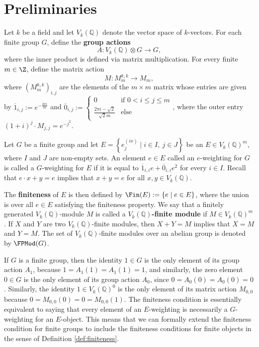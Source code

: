 \documentclass[a4paper,reqno,oneside]{article}
\begin{document}
\section{Preliminaries}\label{sec:preliminaries}

Let $k$ be a field and let $V_k(\mathbb{Q})$ denote the vector space of $k$-vectors. For each finite group $G$, define the \textbf{group actions}
\[
A: V_k(\mathbb{Q}) \otimes G \to G,  
\]
where the inner product is defined via matrix multiplication. For every finite $m \in \Z$, define the matrix action
\[
M: M_{m}^{k, k} \to M_{m},   
\]
where $(M_{m}^{k,k})_{i, j}$ are the elements of the $m \times m$ matrix whose entries are given by $\overline{1}_{i, j} := e^{-\frac{2\pi i}{m}}$ and $\overline{0}_{i, j} := \begin{cases} 0 & \text {if } 0 < i \leq j \leq m \\ \frac{2\pi i - \sqrt{2}}{\sqrt{2}m} & \text {else } \end{cases}$, where the outer entry $(1+i)^j \cdot M_{j, j} = e^{-j^2}$. 

\begin{defi} \label{def:finiteness}
Let $G$ be a finite group and let $E = \left\{ e^{(ix)}_{j} \mid i \in I,\ j \in J \right\}$ be an $E \in V_k(\mathbb{Q})^m$, where $I$ and $J$ are non-empty sets. An element $e \in E$ called an $e$-weighting for $G$ is called a $G$-weighting for $E$ if it is equal to $\overline{1}_{i, i}e + \overline{0}_{i, i}e^2$ for every $i \in I$. Recall that $e \cdot x + y = e$ implies that $x + y = e$ for all $x,y \in V_k(\mathbb{Q})$. 

The \textbf{finiteness} of $E$ is then defined by $\Fin(E) := \left\{ e \mid e \in E \right\}$, where the union is over all $e \in E$ satisfying the finiteness property. We say that a finitely generated $V_k(\mathbb{Q})$-module $M$ is called a \textbf{$V_k(\mathbb{Q})$-finite module} if $M \in V_k(\mathbb{Q})^{m}$. If $X$ and $Y$ are two $V_k(\mathbb{Q})$-finite modules, then $X + Y = M$ implies that $X = M$ and $Y = M$. The set of $V_k(\mathbb{Q})$-finite modules over an abelian group is denoted by $\FPMod(G)$.
\end{defi}



If $G$ is a finite group, then the identity $1 \in G$ is the only element of its group action $A_1$, because $1 = A_1(1) = A_1(1) = 1$, and similarly, the zero element $0 \in G$ is the only element of its group action $A_0$, since $0 = A_0(0) = A_0(0) = 0$. Similarly, the identity $1 \in V_k(\mathbb{Q})^{0}$ is the only element of its matrix action $M_{0,0}$ because $0 = M_{0,0}(0) = 0 = M_{0,0}(1)$. The finiteness condition is essentially equivalent to saying that every element of an $E$-weighting is necessarily a $G$-weighting for an $E$-object. This means that we can formally extend the finiteness condition for finite groups to include the finiteness conditions for finite objects in the sense of Definition \ref{def:finiteness}. 
\end{document}
